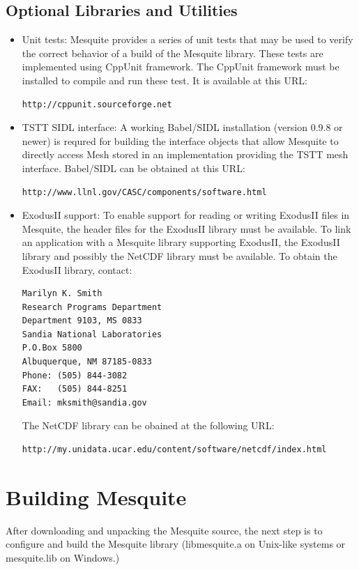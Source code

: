 \subsection{Optional Libraries and Utilities}
\label{sec:depends}
\begin{itemize}
\item Unit tests:  Mesquite provides a series of unit tests that may be used
to verify the correct behavior of a build of the Mesquite library.  These tests
are implemented using CppUnit framework.  The CppUnit framework must be installed
to compile and run these test.  It is available at this URL:
\begin{verbatim}
http://cppunit.sourceforge.net
\end{verbatim}
\item TSTT SIDL interface:  A working Babel/SIDL installation (version 0.9.8 or 
newer) is requred for building the interface objects that allow Mesquite to
directly access Mesh stored in an implementation providing the TSTT mesh interface.  Babel/SIDL can be obtained at this URL:
\begin{verbatim}
http://www.llnl.gov/CASC/components/software.html
\end{verbatim}
\item ExodusII support:  To enable support for reading or writing ExodusII files in Mesquite, the header files for the ExodusII library must be available.  To link an application with a Mesquite library supporting ExodusII, the ExodusII library and possibly the NetCDF library must be available.  To obtain the ExodusII library, contact:
\begin{verbatim}
Marilyn K. Smith
Research Programs Department
Department 9103, MS 0833
Sandia National Laboratories
P.O.Box 5800
Albuquerque, NM 87185-0833
Phone: (505) 844-3082
FAX:   (505) 844-8251
Email: mksmith@sandia.gov
\end{verbatim}
The NetCDF library can be obained at the following URL:
\begin{verbatim}
http://my.unidata.ucar.edu/content/software/netcdf/index.html
\end{verbatim}
\end{itemize}


\section{Building Mesquite}
\label{sec:compiling}
After downloading and unpacking the Mesquite source, the next step is to 
configure and build the Mesquite library (libmesquite.a on Unix-like systems or 
mesquite.lib on Windows.)
